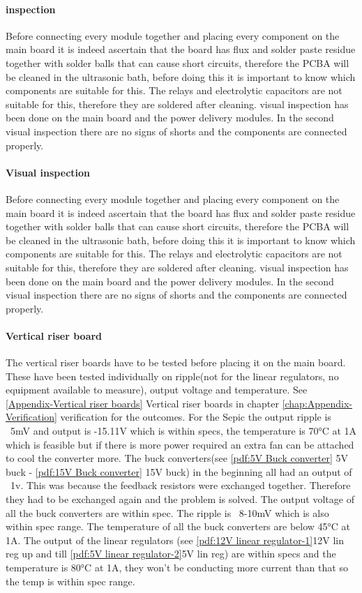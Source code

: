 \paragraph{inspection} Before connecting every module together and placing every component on the main board it is indeed ascertain that the board has flux and solder paste residue together with solder balls that can cause short circuits, therefore the PCBA will be cleaned in the ultrasonic bath, before doing this it is important to know which components are suitable for this. The relays and electrolytic capacitors are not suitable for this, therefore they are soldered after cleaning.  visual inspection has been done on the main board and the power delivery modules. In the second visual inspection there are no signs of shorts and the components are connected properly.
\paragraph{Visual inspection} 

Before connecting every module together and placing every component on the main board it is indeed ascertain that the board has flux and solder paste residue together with solder balls that can cause short circuits, therefore the PCBA will be cleaned in the ultrasonic bath, before doing this it is important to know which components are suitable for this. The relays and electrolytic capacitors are not suitable for this, therefore they are soldered after cleaning.  visual inspection has been done on the main board and the power delivery modules. In the second visual inspection there are no signs of shorts and the components are connected properly.

\paragraph{Vertical riser board}
The vertical riser boards have to be tested before placing it on the main board. These have been tested individually on ripple(not for the linear regulators, no equipment available to measure), output voltage and temperature. See \ref{Appendix-Vertical riser boards} Vertical riser boards in chapter \ref{chap:Appendix-Verification} verification for the outcomes. For the Sepic the output ripple is ~5mV and output is -15.11V which is within specs, the temperature is 70°C at 1A which is feasible but if there is more power required an extra fan can be attached to cool the converter more. The buck converters(see \ref{pdf:5V Buck converter} 5V buck - \ref{pdf:15V Buck converter} 15V buck) in the beginning all had an output of ~1v. This was because the feedback resistors were exchanged together. Therefore they had to be exchanged again and the problem is solved. The output voltage of all the buck converters are within spec. The ripple is ~8-10mV which is also within spec range. The temperature of all the buck converters are below 45°C at 1A. The output of the linear regulators (see \ref{pdf:12V linear regulator-1}12V lin reg up and till \ref{pdf:5V linear regulator-2}5V lin reg) are within specs and the temperature is 80°C at 1A, they won't be conducting more current than that so the temp is within spec range.

